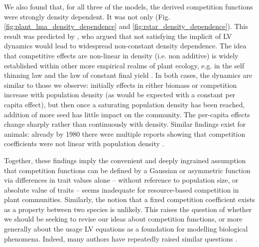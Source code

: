 \documentclass[a4paper,11pt]{article}
\begin{document}
We also found that, for all three of the models, the derived competition functions were strongly density dependent. It was not only
(Fig. \ref{fig:plant_lma_density_dependence} and \ref{fig:rstar_density_dependence}). This result was predicted by \citet{Abrams-1980}, who argued that not satisfying the implicit of LV dynamics would lead to widespread non-constant density dependence. The idea that competitive
effects are non-linear in density (i.e. non additive) is widely established within other more empirical realms of plant ecology, e.g.
in the self thinning law and the law of constant final yield \citep{Harper-1977}.
In both cases, the dynamics are similar to those we observe: initially effects in either biomass or competition increase with population density (as would be expected with a constant per capita effect), but then once a saturating population density has been reached, addition of more seed has little impact on the community. The per-capita effects change sharply rather than continuously with density. Similar findings exist for animals: already by 1980 there were multiple reports showing that competition coefficients were not linear with population density
\citep{Abrams-1980}.

Together, these findings imply the convenient and deeply ingrained assumption that competition functions can be defined by  a Gaussian or asymmetric function via differences in trait values alone -- without reference to population size, or absolute value of traits -- seems inadequate for resource-based competition in plant communities. Similarly, the notion that a fixed competition coefficient exists as a property between two species is unlikely. This raises the question of whether we should be seeking to revise our ideas about competition functions, or more generally about the usage LV equations as a foundation for modelling biological phenomena.
Indeed, many authors have repeatedly raised similar questions \citep[e.g.][]{Andrewartha-1953,
  Neill-1974, Abrams-1975, Wangersky-1978,Abrams-1980, Tilman-1987,
  Abrams-2008}.
\end{document}
